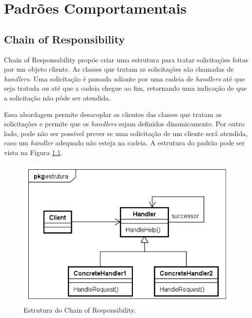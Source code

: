 \chapter{Padrões Comportamentais}

\section{Chain of Responsibility}

Chain of Responsability propõe criar uma estrutura para 
tratar solicitações feitas por um objeto cliente. As classes 
que tratam as solicitações são chamadas de \textit{handlers}. 
Uma solicitação é passada adiante por uma cadeia de 
\textit{handlers} até que seja tratada ou 
até que a cadeia chegue ao fim, retornando uma 
indicação de que a solicitação não pôde ser atendida.\cite{gamma:1995}

Essa abordagem permite desacoplar os clientes das classes 
que tratam as solicitações e permite que os \textit{handlers} 
sejam definidos dinamicamente. Por outro lado, pode não ser 
possível prever se uma solicitação de um cliente será atendida, 
caso um \textit{handler} adequado não esteja na cadeia. A 
estrutura do padrão pode ser vista na Figura \ref{chain_struct}.

\begin{figure}[htb]
	\caption{\label{chain_struct}Estrutura do Chain of Responsibility.}
	\begin{center}
	    \includegraphics[scale=0.5]{5_padroes-contexto-funcional/5.3_comportamentais/5.3.01_chain-of-responsibility/chainofresponsibility_struct.png}
	\end{center}
\end{figure}

